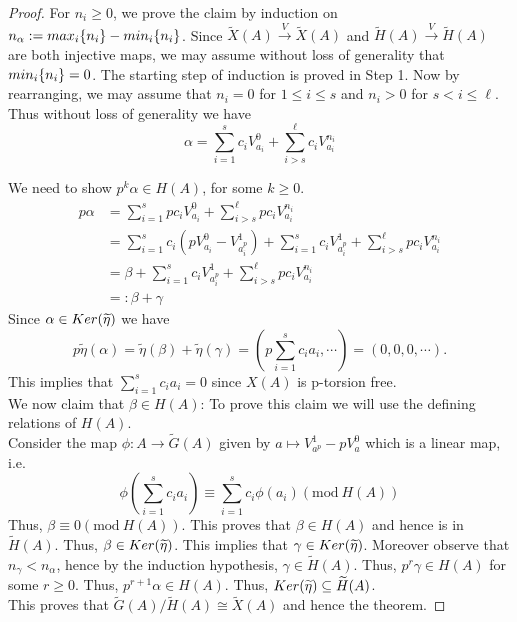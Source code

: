 \documentclass[10pt,a4paper]{amsart}
\newcommand{\Ker}{{\rm Ker  }}
\newcommand{\ac}[1]{\{#1\}}
\renewcommand{\tilde}{\widetilde}
\begin{document}
\begin{proof}
 For $n_i \geq 0$, we prove the claim by induction on $n_{\alpha}: = {\rm max}_i\ac{n_i}- {\rm min}_i \ac{n_i}$. Since $\tilde{X}(A) \xrightarrow{V} \tilde{X}(A)$ and $\tilde{H}(A)\xrightarrow{V} \tilde{H}(A)$ are both injective maps, we may assume without loss of generality that ${\rm min}_i \ac{n_i} = 0$.  The starting step of induction is proved in Step 1. Now by rearranging, we may assume that $n_i = 0$ for $1\leq i \leq s$ and $n_i>0$ for $s < i\leq \ell$. Thus without loss of generality we have 
$$ \alpha = \sum_{i=1}^s c_iV^0_{a_i} + \sum_{i>s}^\ell c_iV^{n_i}_{a_i}$$

\noindent We need to show $p^k \alpha \in H(A)$, for some $k \geq 0$.
\begin{align*}
p\alpha & = \sum_{i=1}^s pc_iV^0_{a_i} + \sum_{i>s}^\ell pc_iV^{n_i}_{a_i} \\ 
       & = \sum_{i=1}^s c_i (pV^0_{a_i}-V^1_{a_i^p}) +\sum_{i=1}^s c_iV^1_{a_i^p} + \sum_{i>s}^\ell pc_iV^{n_i}_{a_i} \\
            & = \beta + \sum_{i=1}^s c_iV^1_{a_i^p} + \sum_{i>s}^\ell pc_iV^{n_i}_{a_i} \\
            & =: \beta + \gamma 
\end{align*}
Since $\alpha \in \Ker(\tilde{\eta})$ we have 
$$p\tilde{\eta}(\alpha) = \tilde{\eta}(\beta) + \tilde{\eta}(\gamma) = (p\sum_{i=1}^sc_ia_i, \cdots ) = (0, 0, 0, \cdots).$$
This implies that $\sum_{i=1}^s c_ia_i = 0$ since $X(A)$ is p-torsion free.\\

\noindent We now claim that $\beta \in H(A)$: To prove this claim we will use the defining relations of $H(A)$.\\
 Consider the map  $\phi: A \to \tilde{G}(A)$ given by $ a \mapsto V^1_{a^p}-pV^0_{a}$ which is a linear map, i.e. 
 $$\phi(\sum_{i=1}^s c_ia_i) \equiv \sum_{i=1}^sc_i \phi(a_i) (\text{mod} \  H(A))$$
 Thus, $\beta \equiv 0 (\text{mod} \  H(A))$. This proves that $\beta \in H(A)$ and hence is in $\tilde{H}(A)$. Thus, $\beta \in \Ker(\tilde{\eta})$. This implies that $\gamma \in \Ker(\tilde{\eta})$. Moreover observe that $n_{\gamma} < n_{\alpha}$, hence by the induction hypothesis, $\gamma \in \tilde{H}(A)$.  Thus, $p^{r}\gamma \in H(A)$ for some $r \geq 0$. Thus, $p^{r+1}\alpha \in H(A)$. 
 Thus, $\Ker(\tilde{\eta}) \subseteq \tilde{H}(A)$. \\ 
 
\noindent This proves that $\tilde{G}(A)/ \tilde{H}(A) \cong \tilde{X}(A)$ and hence the theorem. 
\end{proof}
\end{document}
